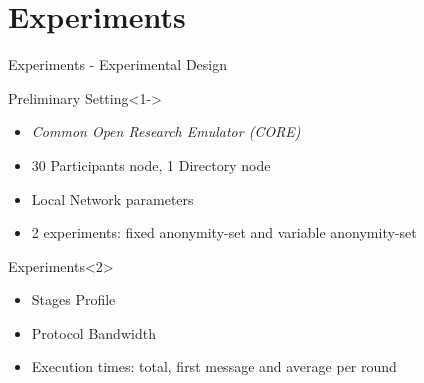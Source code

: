 \section{Experiments}

\begin{frame}{Experiments - Experimental Design}
    
    \begin{block}{Preliminary Setting}<1->
        \begin{itemize}
            \item \emph{Common Open Research Emulator (CORE)}
            \item 30 Participants node, 1 Directory node
            \item Local Network parameters
            \item 2 experiments: fixed anonymity-set and variable anonymity-set
        \end{itemize}
    \end{block}
    
    \begin{block}{Experiments}<2>
        \begin{itemize}
            \item Stages Profile
            \item Protocol Bandwidth
            \item Execution times: total, first message and average per round
        \end{itemize}
    \end{block}
    
\end{frame}